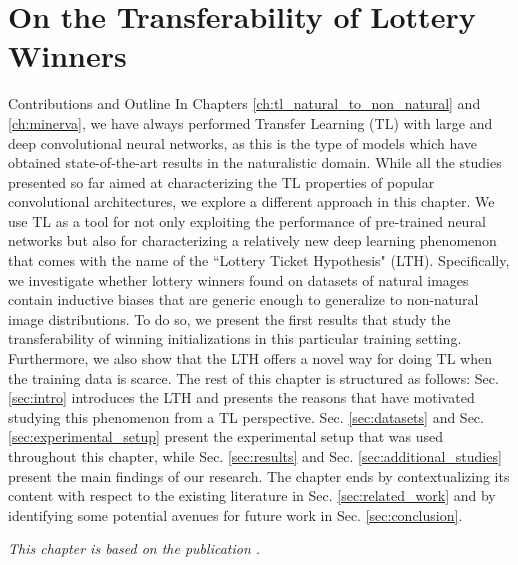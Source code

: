 
\chapter{On the Transferability of Lottery Winners} %
\label{ch:tl_lth} %

\begin{remark}{Contributions and Outline}
	In Chapters \ref{ch:tl_natural_to_non_natural} and \ref{ch:minerva}, we have always performed Transfer Learning (TL) with large and deep convolutional neural networks, as this is the type of models which have obtained state-of-the-art results in the naturalistic domain. While all the studies presented so far aimed at characterizing the TL properties of popular convolutional architectures, we explore a different approach in this chapter. We use TL as a tool for not only exploiting the performance of pre-trained neural networks but also for characterizing a relatively new deep learning phenomenon that comes with the name of the ``Lottery Ticket Hypothesis" (LTH). Specifically, we investigate whether lottery winners found on datasets of natural images contain inductive biases that are generic enough to generalize to non-natural image distributions. To do so, we present the first results that study the transferability of winning initializations in this particular training setting. Furthermore, we also show that the LTH offers a novel way for doing TL when the training data is scarce. The rest of this chapter is structured as follows: Sec. \ref{sec:intro} introduces the LTH and presents the reasons that have motivated studying this phenomenon from a TL perspective. Sec. \ref{sec:datasets} and Sec. \ref{sec:experimental_setup} present the experimental setup that was used throughout this chapter, while Sec. \ref{sec:results} and Sec. \ref{sec:additional_studies} present the main findings of our research. The chapter ends by contextualizing its content with respect to the existing literature in Sec. \ref{sec:related_work} and by identifying some potential avenues for future work in Sec. \ref{sec:conclusion}.

\vspace{5mm}
\textit{This chapter is based on the publication \citet{sabatelli2020transferability}.}

\end{remark}


